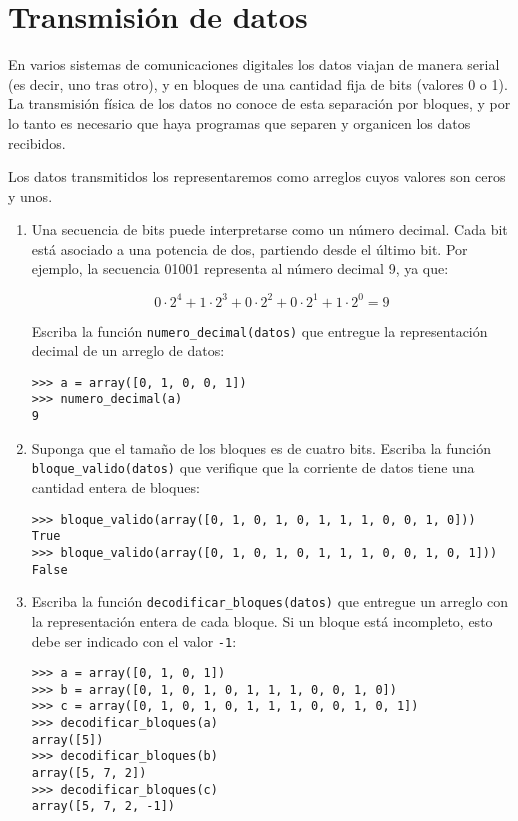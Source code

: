\section{Transmisión de datos}

En varios sistemas de comunicaciones digitales los datos viajan de
manera serial (es decir, uno tras otro), y en bloques de una cantidad
fija de bits (valores 0 o 1). La transmisión física de los datos no
conoce de esta separación por bloques, y por lo tanto es necesario que
haya programas que separen y organicen los datos recibidos.

Los datos transmitidos los representaremos como arreglos cuyos valores
son ceros y unos.

\begin{enumerate}
\item
  Una secuencia de bits puede interpretarse como un número decimal. Cada
  bit está asociado a una potencia de dos, partiendo desde el último
  bit. Por ejemplo, la secuencia 01001 representa al número decimal 9,
  ya que:

  \[0\cdot2^4 +
  1\cdot2^3 +
  0\cdot2^2 +
  0\cdot2^1 +
  1\cdot2^0 = 9\]

  Escriba la función \lstinline!numero_decimal(datos)! que entregue la
  representación decimal de un arreglo de datos:

\begin{lstlisting}
>>> a = array([0, 1, 0, 0, 1])
>>> numero_decimal(a)
9
\end{lstlisting}
\item
  Suponga que el tamaño de los bloques es de cuatro bits. Escriba la
  función \lstinline!bloque_valido(datos)! que verifique que la
  corriente de datos tiene una cantidad entera de bloques:

\begin{lstlisting}
>>> bloque_valido(array([0, 1, 0, 1, 0, 1, 1, 1, 0, 0, 1, 0]))
True
>>> bloque_valido(array([0, 1, 0, 1, 0, 1, 1, 1, 0, 0, 1, 0, 1]))
False
\end{lstlisting}
\item
  Escriba la función \lstinline!decodificar_bloques(datos)! que entregue
  un arreglo con la representación entera de cada bloque. Si un bloque
  está incompleto, esto debe ser indicado con el valor \lstinline!-1!:

\begin{lstlisting}
>>> a = array([0, 1, 0, 1])
>>> b = array([0, 1, 0, 1, 0, 1, 1, 1, 0, 0, 1, 0])
>>> c = array([0, 1, 0, 1, 0, 1, 1, 1, 0, 0, 1, 0, 1])
>>> decodificar_bloques(a)
array([5])
>>> decodificar_bloques(b)
array([5, 7, 2])
>>> decodificar_bloques(c)
array([5, 7, 2, -1])
\end{lstlisting}
\end{enumerate}
